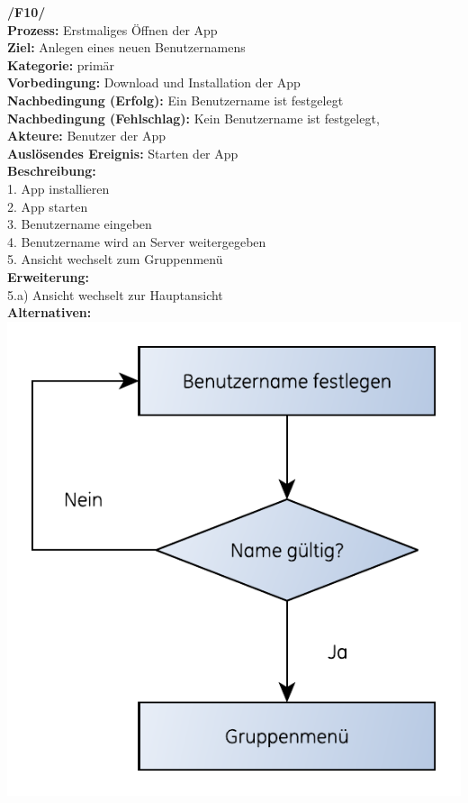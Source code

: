 \usepackage{pdfpages}

\textbf{/F10/} \\
\textbf{Prozess:} Erstmaliges Öffnen der App \\
\textbf{Ziel:} Anlegen eines neuen Benutzernamens \\
\textbf{Kategorie:} primär \\
\textbf{Vorbedingung:} Download und Installation der App \\
\textbf{Nachbedingung (Erfolg):} Ein Benutzername ist festgelegt \\
\textbf{Nachbedingung (Fehlschlag):} Kein Benutzername ist festgelegt,\\
\textbf{Akteure:} Benutzer der App \\
\textbf{Auslösendes Ereignis:} Starten der App\\
\textbf{Beschreibung:} \\
1. App installieren \\
2. App starten       \\
3. Benutzername eingeben \\
4. Benutzername wird an Server weitergegeben \\
5. Ansicht wechselt zum Gruppenmenü \\
\textbf{Erweiterung:} \\
5.a) Ansicht wechselt zur Hauptansicht\\
\textbf{Alternativen:} \\

\includegraphics[scale=0.8]{erstmaliges-starten.pdf}
